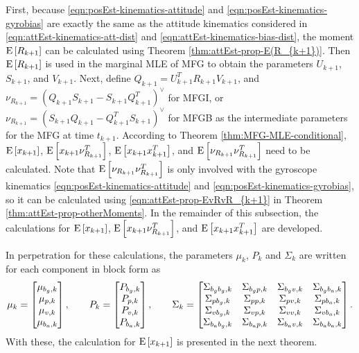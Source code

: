 First, because \eqref{eqn:posEst-kinematics-attitude} and \eqref{eqn:posEst-kinematics-gyrobias} are exactly the same as the attitude kinematics considered in \eqref{eqn:attEst-kinematics-att-dist} and \eqref{eqn:attEst-kinematics-bias-dist}, the moment $\mathrm{E}\left[ R_{k+1} \right]$ can be calculated using Theorem \ref{thm:attEst-prop-E(R_{k+1})}.
Then $\mathrm{E}\left[ R_{k+1} \right]$ is used in the marginal MLE of MFG to obtain the parameters $U_{k+1}$, $S_{k+1}$, and $V_{k+1}$.
Next, define $Q_{k+1} = U_{k+1}^TR_{k+1}V_{k+1}$, and $\nu_{R_{k+1}} = (Q_{k+1}S_{k+1}-S_{k+1}Q_{k+1}^T)^\vee$ for MFGI, or $\nu_{R_{k+1}} = (S_{k+1}Q_{k+1}-Q_{k+1}^TS_{k+1})^\vee$ for MFGB as the intermediate parameters for the MFG at time $t_{k+1}$.
According to Theorem \ref{thm:MFG-MLE-conditional}, $\mathrm{E}\left[ x_{k+1} \right]$, $\mathrm{E}\left[ x_{k+1}\nu_{R_{k+1}}^T \right]$, $\mathrm{E}\left[ x_{k+1}x_{k+1}^T \right]$, and $\mathrm{E}\left[ \nu_{R_{k+1}}\nu_{R_{k+1}}^T \right]$ need to be calculated.
Note that $\mathrm{E}\left[ \nu_{R_{k+1}}\nu_{R_{k+1}}^T \right]$ is only involved with the gyroscope kinematics \eqref{eqn:posEst-kinematics-attitude} and \eqref{eqn:posEst-kinematics-gyrobias}, so it can be calculated using \eqref{eqn:attEst-prop-EvRvR_{k+1}} in Theorem \ref{thm:attEst-prop-otherMoments}.
In the remainder of this subsection, the calculations for $\mathrm{E}\left[ x_{k+1} \right]$, $\mathrm{E}\left[ x_{k+1}\nu_{R_{k+1}}^T \right]$, and $\mathrm{E}\left[ x_{k+1}x_{k+1}^T \right]$ are developed.

In perpetration for these calculations, the parameters $\mu_k$, $P_k$ and $\Sigma_k$ are written for each component in block form as
\begin{gather} \label{eqn:posEst-prop-blocks}
	\allowdisplaybreaks
	\mu_k = \begin{bmatrix}
		\mu_{b_g,k} \\ \mu_{p,k} \\ \mu_{v,k} \\ \mu_{b_a,k}
	\end{bmatrix}, \qquad
	P_k = \begin{bmatrix}
		P_{b_g,k} \\ P_{p,k} \\ P_{v,k} \\ P_{b_a,k}
	\end{bmatrix}, \qquad
	\Sigma_k = \begin{bmatrix}
		\Sigma_{b_gb_g,k} & \Sigma_{b_gp,k} & \Sigma_{b_gv,k} & \Sigma_{b_gb_a,k} \\
		\Sigma_{pb_g,k} & \Sigma_{pp,k} & \Sigma_{pv,k} & \Sigma_{pb_a,k} \\
		\Sigma_{vb_g,k} & \Sigma_{vp,k} & \Sigma_{vv,k} & \Sigma_{vb_a,k} \\
		\Sigma_{b_ab_g,k} & \Sigma_{b_ap,k} & \Sigma_{b_av,k} & \Sigma_{b_ab_a,k}
	\end{bmatrix}.
\end{gather}
With these, the calculation for $\mathrm{E}\left[ x_{k+1} \right]$ is presented in the next theorem.

